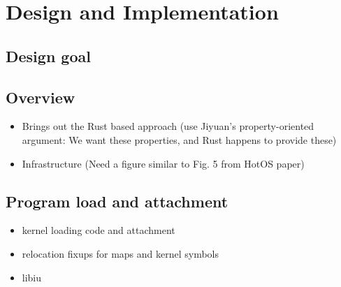 \section{Design and Implementation}

\subsection{Design goal}


\subsection{Overview}
\begin{itemize}
    \item Brings out the Rust based approach (use Jiyuan's property-oriented
        argument: We want these properties, and Rust happens to provide these)
    \item Infrastructure (Need a figure similar to Fig. 5 from HotOS paper)
\end{itemize}

\subsection{Program load and attachment}
\begin{itemize}
    \item kernel loading code and attachment
    \item relocation fixups for maps and kernel symbols
    \item libiu
\end{itemize}

